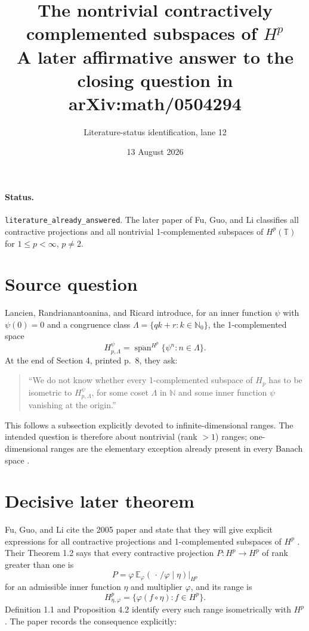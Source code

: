 \documentclass[11pt]{article}
\title{The nontrivial contractively complemented subspaces of $H^p$\\
\large A later affirmative answer to the closing question in arXiv:math/0504294}
\author{Literature-status identification, lane 12}
\date{13 August 2026}
\begin{document}
\maketitle

\paragraph{Status.}
\texttt{literature\_already\_answered}.  The later paper of Fu, Guo, and Li
classifies all contractive projections and all nontrivial 1-complemented
subspaces of $H^p(\mathbb T)$ for $1\le p<\infty$, $p\ne2$.

\section*{Source question}

Lancien, Randrianantoanina, and Ricard introduce, for an inner function
$\psi$ with $\psi(0)=0$ and a congruence class
$\Lambda=\{qk+r:k\in\mathbb N_0\}$, the 1-complemented space
\[
 H^\psi_{p,\Lambda}
 =\overline{\operatorname{span}}^{H^p}\{\psi^n:n\in\Lambda\}.
\]
At the end of Section 4, printed p.~8, they ask:
\begin{quote}
``We do not know whether every 1-complemented subspace of $H_p$ has to be
isometric to $H^\psi_{p,\Lambda}$, for some coset $\Lambda$ in $\mathbb N$
and some inner function $\psi$ vanishing at the origin.''
\end{quote}
This follows a subsection explicitly devoted to infinite-dimensional ranges.
The intended question is therefore about nontrivial (rank $>1$) ranges;
one-dimensional ranges are the elementary exception already present in every
Banach space \cite{LRR}.

\section*{Decisive later theorem}

Fu, Guo, and Li cite the 2005 paper and state that they will give explicit
expressions for all contractive projections and 1-complemented subspaces of
$H^p$ \cite{FGL}.  Their Theorem 1.2 says that every contractive projection
$P:H^p\to H^p$ of rank greater than one is
\[
 P=\varphi\,\mathbb E_\varphi(\,\cdot\,/\varphi\mid\eta)\big|_{H^p}
\]
for an admissible inner function $\eta$ and multiplier $\varphi$, and its
range is
\[
 H^p_{\eta,\varphi}
 =\{\varphi(f\circ\eta):f\in H^p\}.
\]
Definition 1.1 and Proposition 4.2 identify every such range isometrically
with $H^p$.  The paper records the consequence explicitly:
\end{document}
